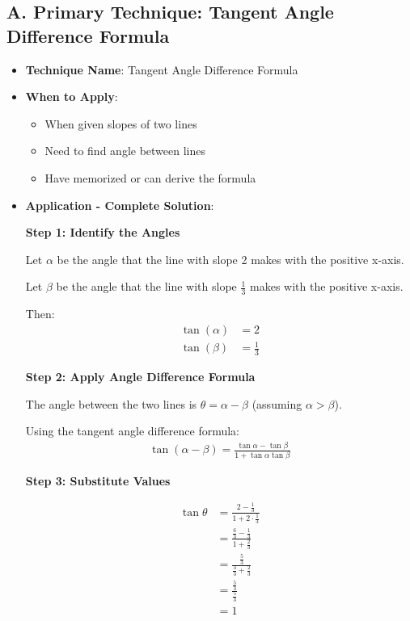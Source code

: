 \documentclass[12pt]{article}
\begin{document}
\begin{techniquesbox}
\subsection*{A. Primary Technique: Tangent Angle Difference Formula}
\begin{itemize}[leftmargin=*]
    \item \textbf{Technique Name}: Tangent Angle Difference Formula
    \item \textbf{When to Apply}: 
    \begin{itemize}
        \item When given slopes of two lines
        \item Need to find angle between lines
        \item Have memorized or can derive the formula
    \end{itemize}
    \item \textbf{Application - Complete Solution}: 
    
    \textbf{Step 1: Identify the Angles}
    
    Let $\alpha$ be the angle that the line with slope 2 makes with the positive x-axis.
    
    Let $\beta$ be the angle that the line with slope $\frac{1}{3}$ makes with the positive x-axis.
    
    Then:
    \begin{align*}
    \tan(\alpha) &= 2\\
    \tan(\beta) &= \frac{1}{3}
    \end{align*}
    
    \textbf{Step 2: Apply Angle Difference Formula}
    
    The angle between the two lines is $\theta = \alpha - \beta$ (assuming $\alpha > \beta$).
    
    Using the tangent angle difference formula:
    \begin{align*}
    \tan(\alpha - \beta) = \frac{\tan\alpha - \tan\beta}{1 + \tan\alpha \tan\beta}
    \end{align*}
    
    \textbf{Step 3: Substitute Values}
    
    \begin{align*}
    \tan\theta &= \frac{2 - \frac{1}{3}}{1 + 2 \cdot \frac{1}{3}}\\
    &= \frac{\frac{6}{3} - \frac{1}{3}}{1 + \frac{2}{3}}\\
    &= \frac{\frac{5}{3}}{\frac{3}{3} + \frac{2}{3}}\\
    &= \frac{\frac{5}{3}}{\frac{5}{3}}\\
    &= 1
    \end{align*}
    

\end{itemize}
\end{techniquesbox}
\end{document}
